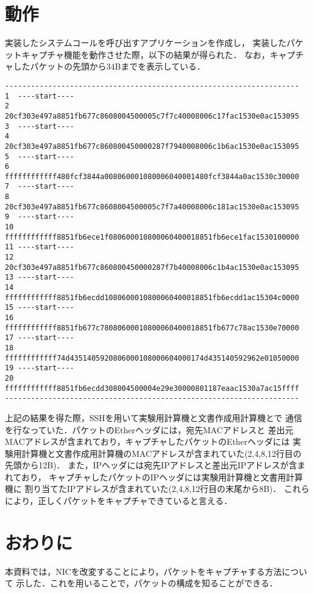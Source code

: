 \documentclass[12pt]{jsarticle}
\begin{document}
\section{動作}
実装したシステムコールを呼び出すアプリケーションを作成し，
実装したパケットキャプチャ機能を動作させた際，以下の結果が得られた．
なお，キャプチャしたパケットの先頭から34Bまでを表示している．
\begin{verbatim}
--------------------------------------------------------------------
1  ----start----
2  20cf303e497a8851fb677c8608004500005c7f7c40008006c17fac1530e0ac153095
3  ----start----
4  20cf303e497a8851fb677c860800450000287f7940008006c1b6ac1530e0ac153095
5  ----start----
6  ffffffffffff480fcf3844a008060001080006040001480fcf3844a0ac1530c30000
7  ----start----
8  20cf303e497a8851fb677c8608004500005c7f7a40008006c181ac1530e0ac153095
9  ----start----
10 ffffffffffff8851fb6ece1f080600010800060400018851fb6ece1fac1530100000
11 ----start----
12 20cf303e497a8851fb677c860800450000287f7b40008006c1b4ac1530e0ac153095
13 ----start----
14 ffffffffffff8851fb6ecdd1080600010800060400018851fb6ecdd1ac15304c0000
15 ----start----
16 ffffffffffff8851fb677c78080600010800060400018851fb677c78ac1530e70000
17 ----start----
18 ffffffffffff74d4351405920806000108000604000174d435140592962e01050000
19 ----start----
20 ffffffffffff8851fb6ecdd308004500004e29e30000801187eaac1530a7ac15ffff
--------------------------------------------------------------------
\end{verbatim}
上記の結果を得た際，SSHを用いて実験用計算機と文書作成用計算機とで
通信を行なっていた．パケットのEtherヘッダには，宛先MACアドレスと
差出元MACアドレスが含まれており，キャプチャしたパケットのEtherヘッダには
実験用計算機と文書作成用計算機のMACアドレスが含まれていた(2,4,8,12行目の先頭から12B)．
また，IPヘッダには宛先IPアドレスと差出元IPアドレスが含まれており，
キャプチャしたパケットのIPヘッダには実験用計算機と文書用計算機に
割り当てたIPアドレスが含まれていた(2,4,8,12行目の末尾から8B)．
これらにより，正しくパケットをキャプチャできていると言える．

\section{おわりに}
本資料では，NICを改変することにより，パケットをキャプチャする方法について
示した．これを用いることで，パケットの構成を知ることができる．
\end{document}
